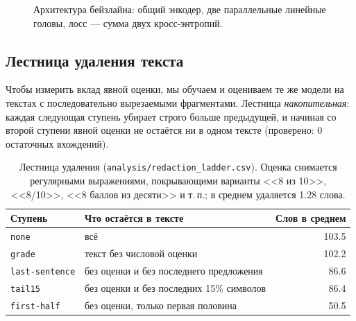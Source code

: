 \documentclass{article}
\begin{document}
\begin{figure}[!tbh]
    \centering
    \caption{Архитектура бейзлайна: общий энкодер, две параллельные линейные головы,
    лосс --- сумма двух кросс-энтропий.}
    \label{fig:model}
\end{figure}

\subsection{Лестница удаления текста}
\label{sec:ladder}

Чтобы измерить вклад явной оценки, мы обучаем и оцениваем те же модели на текстах
с последовательно вырезаемыми фрагментами. Лестница \emph{накопительная}: каждая
следующая ступень убирает строго больше предыдущей, и начиная со второй ступени явной
оценки не остаётся ни в одном тексте (проверено: 0 остаточных вхождений).

\begin{table}[!tbh]
\centering
\begin{tabular}{llr}
\toprule
Ступень & Что остаётся в тексте & Слов в среднем \\
\midrule
\texttt{none}          & всё                                        & 103.5 \\
\texttt{grade}         & текст без числовой оценки                  & 102.2 \\
\texttt{last-sentence} & без оценки и без последнего предложения     & 86.6 \\
\texttt{tail15}        & без оценки и без последних 15\% символов    & 86.4 \\
\texttt{first-half}    & без оценки, только первая половина          & 50.5 \\
\bottomrule
\end{tabular}
\caption{Лестница удаления (\texttt{analysis/redaction\_ladder.csv}). Оценка снимается
регулярными выражениями, покрывающими варианты <<8 из 10>>, <<8/10>>, <<8 баллов из десяти>>
и т.\,п.; в среднем удаляется 1.28 слова.}
\label{tab:ladder}
\end{table}
\end{document}
